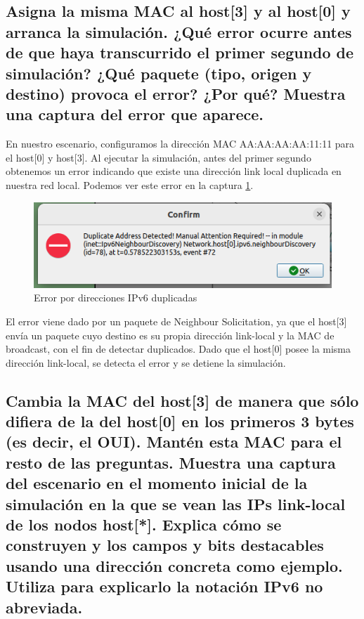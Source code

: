 \subsection{Asigna la misma MAC al host[3] y al host[0] y arranca la simulación. ¿Qué error ocurre antes de que haya transcurrido el primer segundo de simulación? ¿Qué paquete (tipo, origen y destino) provoca el error? ¿Por qué? Muestra una captura del error que aparece.}\label{1.2.1}
\begin{flushleft}
En nuestro escenario, configuramos la dirección MAC AA:AA:AA:AA:11:11 para el host[0] y host[3]. Al ejecutar la simulación, antes del primer segundo obtenemos un error indicando que existe una dirección link local duplicada en nuestra red local. Podemos ver este error en la captura \ref{fig:ej4.1}.

\begin{figure}[h]
    \centering
    \includegraphics[width=\textwidth]{img/ej4.1.png}
    \caption{Error por direcciones IPv6 duplicadas}
    \label{fig:ej4.1}
\end{figure}

El error viene dado por un paquete de Neighbour Solicitation, ya que el host[3] envía un paquete cuyo destino es su propia dirección link-local y la MAC de broadcast, con el fin de detectar duplicados. Dado que el host[0] posee la misma dirección link-local, se detecta el error y se detiene la simulación.
\end{flushleft}


\subsection{Cambia la MAC del host[3] de manera que sólo difiera de la del host[0] en los primeros 3 bytes (es decir, el OUI). Mantén esta MAC para el resto de las preguntas. Muestra una captura del escenario en el momento inicial de la simulación en la que se vean las IPs link-local de los nodos host[*]. Explica cómo se construyen y los campos y bits destacables usando una dirección concreta como ejemplo. Utiliza para explicarlo la notación IPv6 no abreviada.}


